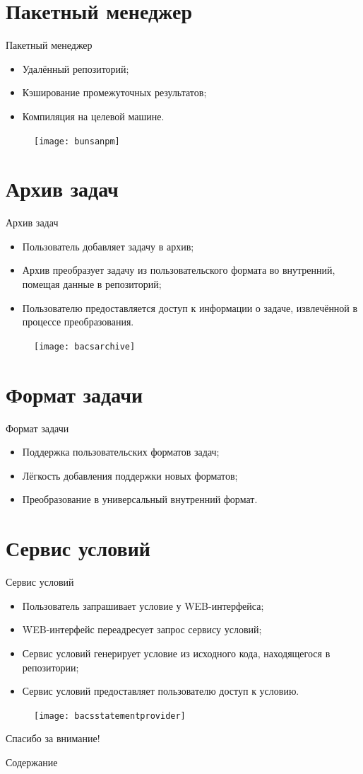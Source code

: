 \documentclass[xetex,mathserif,serif,10pt]{beamer}
\newenvironment{sframe}[2]{\section{#1}\begin{frame}[label=#2]{#1}}{\end{frame}}
\begin{document}
    \begin{sframe}{Пакетный менеджер}{bunsanpm}
        \begin{itemize}
            \item Удалённый репозиторий;
            \item Кэширование промежуточных результатов;
            \item Компиляция на целевой машине.
        \end{itemize}
        \begin{figure}
            \centering
            \texttt{[image: bunsanpm]}
        \end{figure}
    \end{sframe}

    \begin{sframe}{Архив задач}{bacsarchive}
        \begin{itemize}
            \item Пользователь добавляет задачу в архив;
            \item Архив преобразует задачу из пользовательского формата во внутренний,
                помещая данные в репозиторий;
            \item Пользователю предоставляется доступ к информации о задаче,
                извлечённой в процессе преобразования.
        \end{itemize}
        \begin{figure}
            \centering
            \texttt{[image: bacsarchive]}
        \end{figure}
    \end{sframe}

    \begin{sframe}{Формат задачи}{bacsproblem}
        \begin{itemize}
            \item Поддержка пользовательских форматов задач;
            \item Лёгкость добавления поддержки новых форматов;
            \item Преобразование в универсальный внутренний формат.
        \end{itemize}
    \end{sframe}

    \begin{sframe}{Сервис условий}{bacsstatementprovider}
        \begin{itemize}
            \item Пользователь запрашивает условие у WEB-интерфейса;
            \item WEB-интерфейс переадресует запрос сервису условий;
            \item Сервис условий генерирует условие из исходного кода,
                находящегося в репозитории;
            \item Сервис условий предоставляет пользователю доступ к условию.
        \end{itemize}
        \begin{figure}
            \centering
            \texttt{[image: bacsstatementprovider]}
        \end{figure}
    \end{sframe}

    \begin{frame}
        \Large\centering Спасибо за внимание!
    \end{frame}

    \begin{frame}{Содержание}
        \tableofcontents
    \end{frame}
\end{document}
